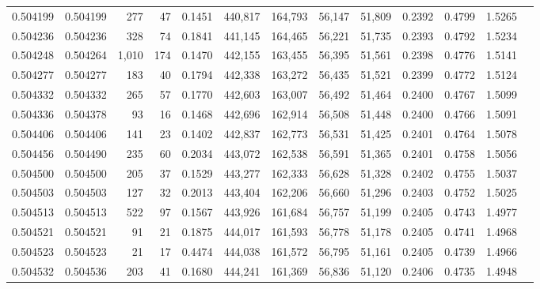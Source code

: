 \begin{tabular}{rrrrrrrrrrrrr}
0.504199 & 0.504199 &   277 &    47 &                                     0.1451 & 440,817 & 164,793 &  56,147 &  51,809 & 0.2392 & 0.4799 & 1.5265 \\
0.504236 & 0.504236 &   328 &    74 &                                     0.1841 & 441,145 & 164,465 &  56,221 &  51,735 & 0.2393 & 0.4792 & 1.5234 \\
0.504248 & 0.504264 & 1,010 &   174 &                                     0.1470 & 442,155 & 163,455 &  56,395 &  51,561 & 0.2398 & 0.4776 & 1.5141 \\
0.504277 & 0.504277 &   183 &    40 &                                     0.1794 & 442,338 & 163,272 &  56,435 &  51,521 & 0.2399 & 0.4772 & 1.5124 \\
0.504332 & 0.504332 &   265 &    57 &                                     0.1770 & 442,603 & 163,007 &  56,492 &  51,464 & 0.2400 & 0.4767 & 1.5099 \\
0.504336 & 0.504378 &    93 &    16 &                                     0.1468 & 442,696 & 162,914 &  56,508 &  51,448 & 0.2400 & 0.4766 & 1.5091 \\
0.504406 & 0.504406 &   141 &    23 &                                     0.1402 & 442,837 & 162,773 &  56,531 &  51,425 & 0.2401 & 0.4764 & 1.5078 \\
0.504456 & 0.504490 &   235 &    60 &                                     0.2034 & 443,072 & 162,538 &  56,591 &  51,365 & 0.2401 & 0.4758 & 1.5056 \\
0.504500 & 0.504500 &   205 &    37 &                                     0.1529 & 443,277 & 162,333 &  56,628 &  51,328 & 0.2402 & 0.4755 & 1.5037 \\
0.504503 & 0.504503 &   127 &    32 &                                     0.2013 & 443,404 & 162,206 &  56,660 &  51,296 & 0.2403 & 0.4752 & 1.5025 \\
0.504513 & 0.504513 &   522 &    97 &                                     0.1567 & 443,926 & 161,684 &  56,757 &  51,199 & 0.2405 & 0.4743 & 1.4977 \\
0.504521 & 0.504521 &    91 &    21 &                                     0.1875 & 444,017 & 161,593 &  56,778 &  51,178 & 0.2405 & 0.4741 & 1.4968 \\
0.504523 & 0.504523 &    21 &    17 &                                     0.4474 & 444,038 & 161,572 &  56,795 &  51,161 & 0.2405 & 0.4739 & 1.4966 \\
0.504532 & 0.504536 &   203 &    41 &                                     0.1680 & 444,241 & 161,369 &  56,836 &  51,120 & 0.2406 & 0.4735 & 1.4948 \\

\end{tabular}
